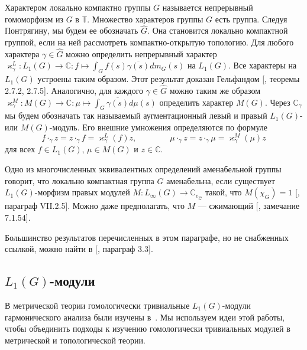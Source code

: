 Характером локально компактно группы $G$ называется непрерывный гомоморфизм из
$G$ в $\mathbb{T}$. Множество характеров группы $G$ есть группа. Следуя
Понтрягину, мы будем ее обозначать $\widehat{G}$. Она становится локально
компактной группой, если на ней рассмотреть компактно-открытую топологию. Для
любого характера $\gamma\in\widehat{G}$ можно определить непрерывный характер
$\varkappa_\gamma^L:L_1(G)\to\mathbb{C}:f\mapsto \int_G
f(s)\overline{\gamma(s)}dm_G(s)$ на $L_1(G)$. Все характеры на $L_1(G)$ устроены
таким образом. Этот результат доказан Гельфандом [\cite{KaniBanAlg}, теоремы
2.7.2, 2.7.5]. Аналогично, для каждого $\gamma\in\widehat{G}$ 
можно таким же образом 
$\varkappa_\gamma^M:M(G)\to\mathbb{C}
:\mu\mapsto\int_{G} \overline{\gamma(s)}d\mu(s)$ определить характер $M(G)$. 
Через $\mathbb{C}_\gamma$ мы будем обозначать так называемый 
аугментационный левый и правый $L_1(G)$- или $M(G)$-модуль. 
Его внешние умножения определяются по формуле
$$
f\cdot_{\gamma}z=z\cdot_{\gamma}f=\varkappa_\gamma^L(f)z,
\qquad\qquad
\mu\cdot_{\gamma}z=z\cdot_{\gamma}\mu=\varkappa_\gamma^M(\mu)z
$$
для всех $f\in L_1(G)$, $\mu\in M(G)$ и $z\in\mathbb{C}$. 

Одно из многочисленных эквивалентных определений аменабельной группы говорит,
что локально компактная группа $G$ аменабельна, если существует $L_1(G)$-морфизм
правых модулей $M:L_\infty(G)\to\mathbb{C}_{e_{\widehat{G}}}$ такой, что
$M(\chi_G)=1$ [\cite{HelBanLocConvAlg}, параграф VII.2.5]. Можно даже
предполагать, что $M$ --- сжимающий [\cite{HelBanLocConvAlg}, замечание 7.1.54].

Большинство результатов перечисленных в этом параграфе, но не снабженных
ссылкой, можно найти в [\cite{DalBanAlgAutCont}, параграф 3.3].


\subsection{
    \texorpdfstring{$L_1(G)$}{L1(G)}-модули}\label{SubSectionL1GModules}

В метрической теории гомологически тривиальные $L_1(G)$-модули гармонического
анализа были изучены в~\cite{GravInjProjBanMod}. Мы используем идеи этой работы,
чтобы объединить подходы к изучению гомологически тривиальных модулей в
метрической и топологической теории. 

